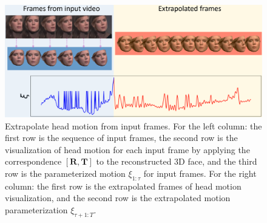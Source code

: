 \documentclass[runningheads]{llncs}
\begin{document}
 
\begin{figure}
\includegraphics[width=1.0 \linewidth]{latex/images/faces.png}
\caption{Extrapolate head motion from input frames. For the left column: the first row is the sequence of input frames, the second row is the visualization of head motion for each input frame by applying the correspondence $[\mathbf{R},\mathbf{T}]$ to the reconstructed 3D face, and the third row is the parameterized motion $\xi_{1:\tau}$ for input frames. For the right column: the first row is the extrapolated frames of head motion visualization, and the second row is the extrapolated motion parameterization $\xi_{\tau+1:T}$.}
\label{fig:rtextra}
\end{figure}
 
\end{document}
